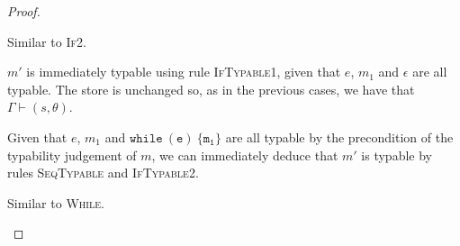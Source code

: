 \begin{proof}
\begin{case}[If2]
  \end{case}

  \begin{case}[If3]
	Similar to \textsc{If2}.
  \end{case}

  \begin{case}[If4]
	$m'$ is immediately typable using rule \textsc{IfTypable1}, given that
	$e$, $m_1$ and $\epsilon$ are all typable. The store is unchanged so,
	as in the previous cases, we have that $\Gamma\vdash(s,\theta)$.
  \end{case}

  \begin{case}[While]
	Given that $e$, $m_1$ and $\mathtt{while\ (e)\ \{m_1\}}$ are all typable by the precondition
	of the typability judgement of $m$, we can immediately deduce that $m'$ is 
	typable by rules \textsc{SeqTypable} and \textsc{IfTypable2}.
  \end{case}

  \begin{case}[For]
	Similar to \textsc{While}.
  \end{case}

\end{proof}
